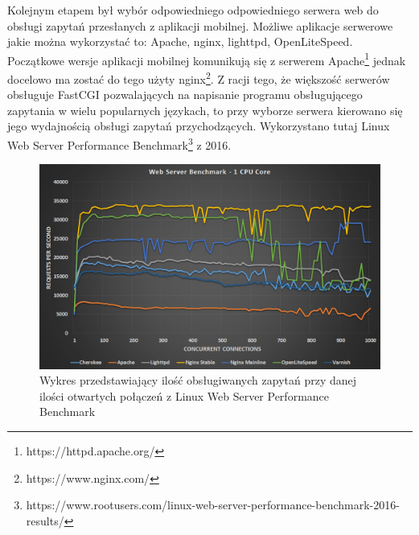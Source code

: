 \documentclass{report}
\begin{document}
	Kolejnym etapem był wybór odpowiedniego odpowiedniego serwera web do obsługi zapytań przesłanych z aplikacji mobilnej. Możliwe aplikacje serwerowe jakie można wykorzystać to: Apache, nginx, lighttpd, OpenLiteSpeed. Początkowe wersje aplikacji mobilnej komunikują się z serwerem Apache\footnote{https://httpd.apache.org/} jednak docelowo ma zostać do tego użyty nginx\footnote{https://www.nginx.com/}. Z racji tego, że większość serwerów obsługuje FastCGI pozwalających na napisanie programu obsługującego zapytania w wielu popularnych językach, to przy wyborze serwera kierowano się jego wydajnością obsługi zapytań przychodzących. Wykorzystano tutaj Linux Web Server Performance Benchmark\footnote{https://www.rootusers.com/linux-web-server-performance-benchmark-2016-results/} z 2016.
	
	
	\begin{center}
		\begin{figure}[ht]
			\centering
			\includegraphics[scale=0.3]{web-server-performance-benchmark-1-cpu-core-1.jpg}
			\caption{Wykres przedstawiający ilość obsługiwanych zapytań przy danej ilości otwartych połączeń z Linux Web Server Performance Benchmark}
		\end{figure}
	\end{center}
	
\end{document}

